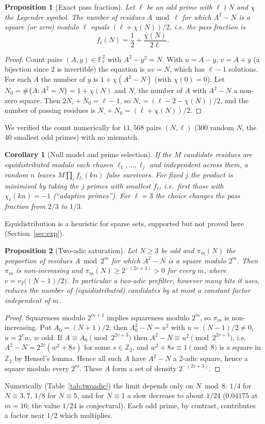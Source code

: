 \documentclass[11pt,a4paper]{article}
\newtheorem{proposition}{Proposition}[section]
\newtheorem{corollary}{Corollary}[section]
\newcommand{\Zp}{\mathbb Z_2}
\begin{document}
\begin{proposition}[Exact pass fraction]\label{prop:pass}
Let $\ell$ be an odd prime with $\ell\nmid N$ and $\chi$ the Legendre symbol. The number of residues $A\bmod\ell$ for which $A^2-N$ is a square (or zero) modulo $\ell$ equals $(\ell+\chi(N))/2$, i.e. the pass fraction is
\[
f_\ell(N)=\frac12+\frac{\chi(N)}{2\ell}.
\]
\end{proposition}
\begin{proof}
Count pairs $(A,y)\in\mathbb F_\ell^2$ with $A^2-y^2=N$. With $u=A-y$, $v=A+y$ (a bijection since $2$ is invertible) the equation is $uv=N$, which has $\ell-1$ solutions. For each $A$ the number of $y$ is $1+\chi(A^2-N)$ (with $\chi(0)=0$). Let $N_0=\#\{A:A^2=N\}=1+\chi(N)$ and $N_{\square}$ the number of $A$ with $A^2-N$ a non-zero square. Then $2N_\square+N_0=\ell-1$, so $N_\square=(\ell-2-\chi(N))/2$, and the number of passing residues is $N_\square+N_0=(\ell+\chi(N))/2$.
\end{proof}
We verified the count numerically for $11{,}568$ pairs $(N,\ell)$ ($300$ random $N$, the $40$ smallest odd primes) with no mismatch.

\begin{corollary}[Null model and prime selection]\label{cor:null}
If the $M$ candidate residues are equidistributed modulo each chosen $\ell_1,\dots,\ell_j$ and independent across them, a random $n$ leaves $M\prod_{i}f_{\ell_i}(kn)$ false survivors. For fixed $j$ the product is minimised by taking the $j$ primes with smallest $f_\ell$, i.e.\ first those with $\chi_\ell(kn)=-1$ (``adaptive primes''). For $\ell=3$ the choice changes the pass fraction from $2/3$ to $1/3$.
\end{corollary}
Equidistribution is a heuristic for sparse sets, supported but not proved here (Section~\ref{sec:exp}).

\begin{proposition}[Two-adic saturation]\label{prop:sat}
Let $N\ge3$ be odd and $\pi_m(N)$ the proportion of residues $A\bmod 2^m$ for which $A^2-N$ is a square modulo $2^m$. Then $\pi_m$ is non-increasing and $\pi_m(N)\ge 2^{-(2v+3)}>0$ for every $m$, where $v=v_2\bigl((N-1)/2\bigr)$. In particular a two-adic prefilter, however many bits it uses, reduces the number of (equidistributed) candidates by at most a constant factor independent of $m$.
\end{proposition}
\begin{proof}
Squareness modulo $2^{m+1}$ implies squareness modulo $2^m$, so $\pi_m$ is non-increasing. Put $A_0=(N+1)/2$; then $A_0^2-N=u^2$ with $u=(N-1)/2\neq0$, $u=2^vw$, $w$ odd. If $A\equiv A_0\pmod{2^{2v+3}}$ then $A^2-N\equiv u^2\pmod{2^{2v+3}}$, i.e.\ $A^2-N=2^{2v}(w^2+8s)$ for some $s\in\Zp$, and $w^2+8s\equiv1\pmod 8$ is a square in $\Zp$ by Hensel's lemma. Hence all such $A$ have $A^2-N$ a 2-adic square, hence a square modulo every $2^m$. These $A$ form a set of density $2^{-(2v+3)}$.
\end{proof}
Numerically (Table~\ref{tab:twoadic}) the limit depends only on $N\bmod8$: $1/4$ for $N\equiv3,7$, $1/8$ for $N\equiv5$, and for $N\equiv1$ a slow decrease to about $1/24$ ($0.04175$ at $m=16$; the value $1/24$ is conjectural). Each odd prime, by contrast, contributes a factor near $1/2$ which multiplies.
\end{document}
